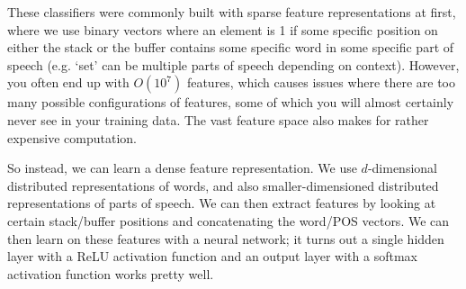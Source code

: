 These classifiers were commonly built with sparse feature representations at first, where we use binary vectors where an element is 1 if some specific position on either the stack or the buffer contains some specific word in some specific part of speech (e.g. `set' can be multiple parts of speech depending on context). However, you often end up with $O(10^7)$ features, which causes issues where there are too many possible configurations of features, some of which you will almost certainly never see in your training data. The vast feature space also makes for rather expensive computation.

So instead, we can learn a dense feature representation. We use $d$-dimensional distributed representations of words, and also smaller-dimensioned distributed representations of parts of speech. We can then extract features by looking at certain stack/buffer positions and concatenating the word/POS vectors. We can then learn on these features with a neural network; it turns out a single hidden layer with a ReLU activation function and an output layer with a softmax activation function works pretty well.

